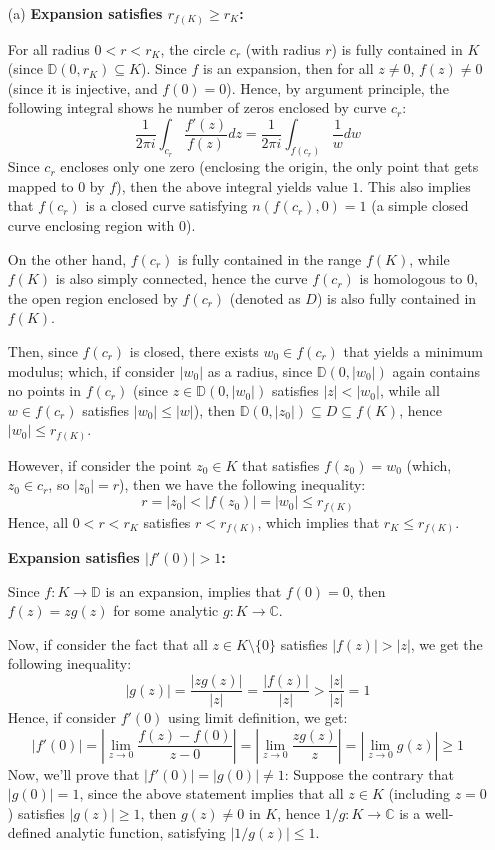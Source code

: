 \documentclass{article}
\begin{document}
\begin{itemize}
    \item[(a)] \textbf{Expansion satisfies $r_{f(K)}\geq r_K$:}
    
    For all radius $0<r<r_K$, the circle $c_r$ (with radius $r$) is fully contained in $K$ (since $\mathbb{D}(0,r_K)\subseteq K$).
    Since $f$ is an expansion, then for all $z\neq 0$, $f(z)\neq 0$ (since it is injective, and $f(0)=0$). Hence, by argument principle,
    the following integral shows he number of zeros enclosed by curve $c_r$:
    $$\frac{1}{2\pi i}\int_{c_r}\frac{f'(z)}{f(z)}dz = \frac{1}{2\pi i}\int_{f(c_r)}\frac{1}{w}dw$$
    Since $c_r$ encloses only one zero (enclosing the origin, the only point that gets mapped to $0$ by $f$), then the above integral yields value $1$.
    This also implies that $f(c_r)$ is a closed curve satisfying $n(f(c_r),0)=1$ (a simple closed curve enclosing region with $0$).

    On the other hand, $f(c_r)$ is fully contained in the range $f(K)$, while $f(K)$ is also simply connected, hence the curve $f(c_r)$ is homologous to $0$,
    the open region enclosed by $f(c_r)$ (denoted as $D$) is also fully contained in $f(K)$.

    Then, since $f(c_r)$ is closed, there exists $w_0\in f(c_r)$ that yields a minimum modulus; which, if consider $|w_0|$ as a radius, since $\mathbb{D}(0,|w_0|)$ again contains no points in $f(c_r)$ (since $z\in \mathbb{D}(0,|w_0|)$ satisfies $|z|<|w_0|$, while all $w\in f(c_r)$ satisfies $|w_0|\leq |w|$),
    then $\mathbb{D}(0,|z_0|)\subseteq D \subseteq f(K)$, hence $|w_0|\leq r_{f(K)}$.

    However, if consider the point $z_0\in K$ that satisfies $f(z_0)=w_0$ (which, $z_0\in c_r$, so $|z_0|=r$), then we have the following inequality:
    $$r=|z_0|<|f(z_0)|=|w_0|\leq r_{f(K)}$$
    Hence, all $0<r<r_K$ satisfies $r<r_{f(K)}$, which implies that $r_K\leq r_{f(K)}$.

    \hfil

    \textbf{Expansion satisfies $|f'(0)|>1$:}

    Since $f:K\rightarrow\mathbb{D}$ is an expansion, implies that $f(0)=0$, then $f(z)=zg(z)$ for some analytic $g:K\rightarrow\mathbb{C}$.

    Now, if consider the fact that all $z\in K\setminus\{0\}$ satisfies $|f(z)|>|z|$, we get the following inequality:
    $$|g(z)|=\frac{|zg(z)|}{|z|}=\frac{|f(z)|}{|z|} > \frac{|z|}{|z|}=1$$
    Hence, if consider $f'(0)$ using limit definition, we get:
    $$|f'(0)|=\left|\lim_{z\rightarrow 0}\frac{f(z)-f(0)}{z-0}\right|=\left|\lim_{z\rightarrow 0}\frac{zg(z)}{z}\right|=|\lim_{z\rightarrow 0}g(z)| \geq 1$$
    Now, we'll prove that $|f'(0)|=|g(0)|\neq 1$: Suppose the contrary that $|g(0)|=1$, since the above statement implies that all $z\in K$ (including $z=0$) satisfies $|g(z)|\geq 1$, then $g(z)\neq 0$ in $K$, hence $1/g:K\rightarrow\mathbb{C}$ is a well-defined analytic function, satisfying $|1/g(z)|\leq 1$.


\end{itemize}
\end{document}
